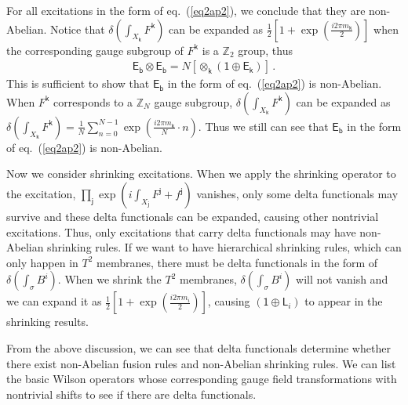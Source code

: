 \documentclass[11pt,nofootinbib,preprint]{revtex4-1}
\begin{document}
For all excitations in the form of eq.~(\ref{eq2ap2}), we conclude that they are non-Abelian. Notice that $\delta \left( \int_{X _{\mathsf{k}}}{F^{\mathsf{k}}} \right) $ can be expanded as $\frac{1}{2}\left[ 1+\exp \left( \frac{i2\pi m_{\mathsf{k}}}{2} \right) \right] $ when the corresponding gauge subgroup of $F^{\mathsf{k}}$ is a $\mathbb{Z}_2$ group, thus 
\begin{align}
	\mathsf{E_b}\otimes \mathsf{E_b}=N\left[ \otimes _{\mathsf{k}}\left( \mathsf{1}\oplus \mathsf{E}_{\mathsf{k}} \right) \right] \,.
\end{align}
This is sufficient to show that $\mathsf{E_b}$ in the form of eq.~(\ref{eq2ap2}) is non-Abelian. When $F^{\mathsf{k}}$ corresponds to a $\mathbb{Z}_N$ gauge subgroup, $\delta \left( \int_{X _{\mathsf{k}}}{F^{\mathsf{k}}} \right) $ can be expanded as $\delta \left( \int_{X_{\mathsf{k}}}{F^{\mathsf{k}}} \right) =\frac{1}{N}\sum_{n=0}^{N-1}{\exp \left( \frac{i2\pi m_{\mathsf{k}}}{N}\cdot n \right)}
$. Thus we still can see that $\mathsf{E_b}$ in the form of eq.~(\ref{eq2ap2}) is non-Abelian.

Now we consider shrinking excitations. When we apply the shrinking operator to the excitation, $\prod_{\mathsf{j}}{\exp \left( i\int_{X _{\mathsf{j}}}{F^{\mathsf{j}}+f^{\mathsf{j}}} \right)}$ vanishes, only some delta functionals may survive and these delta functionals can be expanded, causing other nontrivial excitations. Thus, only excitations that carry delta functionals may have non-Abelian shrinking rules. If we want to have hierarchical shrinking rules, which can only happen in $T^2$ membranes, there must be delta functionals in the form of $\delta \left( \int_{\sigma}{B^i} \right) $. When we shrink the $T^2$ membranes, $\delta \left( \int_{\sigma}{B^i} \right) $ will not vanish and we can expand it as $\frac{1}{2}\left[ 1+\exp \left( \frac{i2\pi m_i}{2} \right) \right] $, causing $\left( \mathsf{1}\oplus \mathsf{L}_i \right)$ to appear in the shrinking results.

From the above discussion, we can see that delta functionals determine whether there exist non-Abelian fusion rules and non-Abelian shrinking rules. We can list the basic Wilson operators whose corresponding gauge field transformations with nontrivial shifts to see if there are delta functionals.
\end{document}
